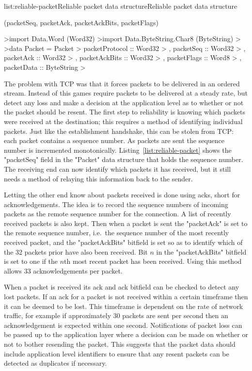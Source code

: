 
\vspace{-0.5em}
\begin{listing}{list:reliable-packet}{Reliable packet data structure}{Reliable packet data structure}{}
\end{listing}\vspace{-1.5em}

\functions(packetSeq, packetAck, packetAckBits, packetFlags)
\begin{haskell}
>import Data.Word (Word32)
>import Data.ByteString.Char8 (ByteString)
>
>data Packet = Packet
>  { packetProtocol :: Word32
>  , packetSeq :: Word32
>  , packetAck :: Word32
>  , packetAckBits :: Word32
>  , packetFlags :: Word8
>  , packetData :: ByteString
>  }

\end{haskell}
\noindent
The problem with TCP was that it forces packets to be delivered in an ordered stream. Instead
of this games require packets to be delivered at a steady rate, but detect any loss and make a
decision at the application level as to whether or not the packet should be resent. The first
step to reliability is knowing which packets were received at the destination; this requires
a method of identifying individual packets. Just like the establishment handshake, this can be
stolen from TCP: each packet contains a sequence number. As packets are sent the sequence number
is incremented monotonically. Listing~\ref{list:reliable-packet} shows the "packetSeq" field in
the "Packet" data structure that holds the sequence number. The receiving end can now identify
which packets it has received, but it still needs a method of relaying this information back
to the sender.

Letting the other end know about packets received is done using acks, short for acknowledgements.
The idea is to record the sequence numbers of incoming packets as the remote sequence number for
the connection. A list of recently received packets is also kept. Then when a packet is sent the
"packetAck" is set to the remote sequence number, i.e.\ the sequence number of the most recently
received packet, and the "packetAckBits" bitfield is set so as to identify which of the 32 packets
prior have also been received. Bit $n$ in the "packetAckBits" bitfield is set to one if the $n$th
most recent packet has been received. Using this method allows 33 acknowledgements per packet.

When a packet is received its ack and ack bitfield can be checked to detect any lost packets.
If an ack for a packet is not received within a certain timeframe then it can be deemed to be
lost. This timeframe is dependent on the rate of network traffic, for example if approximately
30 packets are sent per second then an acknowledgement is expected within one second. Notifications
of packet loss can be passed up to the application layer where a decision can be made on whether
or not to bother resending the packet. This suggests that the packet data should include application
level identifiers to ensure that any resent packets can be detected as duplicates if necessary.

